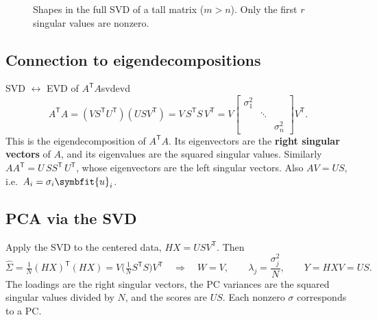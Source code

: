 \documentclass[11pt]{article}
\newcommand{\bm}[1]{\symbfit{#1}}
\let\vv\relax\newcommand{\vv}{\bm{v}}
\newcommand{\vu}{\bm{u}}
\newcommand{\Sig}{\widehat{\Sigma}}
\newcommand{\T}{^{\mathsf T}}
\begin{document}
\begin{figure}[htbp]
\centering
{}
\caption{Shapes in the full SVD of a tall matrix ($m>n$). Only the first $r$ singular values are nonzero.}
\end{figure}

\subsection{Connection to eigendecompositions}

\begin{proposition}{SVD $\leftrightarrow$ EVD of $A\T A$}{svdevd}
\[
A\T A=(VS\T U\T)(USV\T)=V\,S\T S\,V\T=V\begin{bmatrix}\sigma_1^2&&\\&\ddots&\\&&\sigma_n^2\end{bmatrix}V\T .
\]
This is the eigendecomposition of $A\T A$. Its eigenvectors are the \textbf{right singular
vectors} of $A$, and its eigenvalues are the squared singular values. Similarly
$AA\T=U\,SS\T\,U\T$, whose eigenvectors are the left singular vectors. Also
$AV=US$, i.e.\ $A\vv_i=\sigma_i\vu_i$.
\end{proposition}

\subsection{PCA via the SVD}\label{sec:pcasvd}

Apply the SVD to the centered data, $HX=USV\T$. Then
\[
\Sig=\tfrac1N(HX)\T(HX)=V\Big(\tfrac1N S\T S\Big)V\T
\quad\Longrightarrow\quad
W=V,\qquad \lambda_j=\frac{\sigma_j^2}{N},\qquad Y=HXV=US .
\]
The loadings are the right singular vectors, the PC variances are the squared singular
values divided by $N$, and the scores are $US$. Each nonzero $\sigma$ corresponds to a PC.
\end{document}
